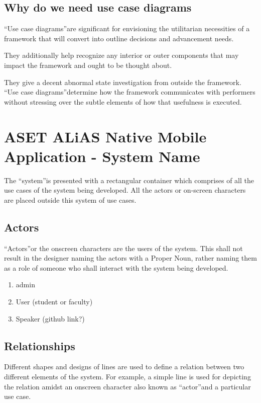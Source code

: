 \subsection{Why do we need use case diagrams}
\textquotedblleft Use case diagrams\textquotedblright are significant for envisioning the utilitarian necessities of a framework that will convert into outline decisions and advancement needs.\par \smallskip
They additionally help recognize any interior or outer components that may impact the framework and ought to be thought about.\par \smallskip
They give a decent abnormal state investigation from outside the framework. \textquotedblleft Use case diagrams\textquotedblright determine how the framework communicates with performers without stressing over the subtle elements of how that usefulness is executed.

\section{ASET ALiAS Native Mobile Application - System Name}
The \textquotedblleft system\textquotedblright is presented with a rectangular container which comprises of all the use cases of the system being developed. All the actors or on-screen characters are placed outside this system of use cases.

\subsection{Actors}
\textquotedblleft Actors\textquotedblright or the onscreen characters are the users of the system. This shall not result in the designer naming the actors with a Proper Noun, rather naming them as a role of someone who shall interact with the system being developed.
\begin{enumerate}
    \item admin
    \item User (student or faculty)
    \item Speaker (github link?)
\end{enumerate}

\subsection{Relationships}
Different shapes and designs of lines are used to define a relation between two different elements of the system. For example, a simple line is used for depicting the relation amidst an onscreen character also known as \textquotedblleft actor\textquotedblright and a particular use case. 

